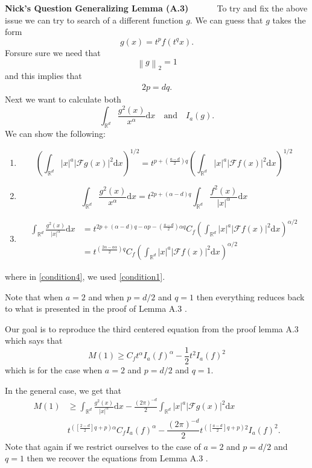 \documentclass[a4paper,11pt]{article}
\numberwithin{equation}{section}
\theoremstyle{plain}
\theoremstyle{definition}
\newcommand{\ud}{\ensuremath{\mathrm{d} }}
\newcommand{\Norm}[1]{\left\|  #1   \right\|}
\newcommand{\R}{\mathbb{R}}
\newcounter{NQ}
\newenvironment{NickQuestion}[1][] %
{\refstepcounter{NQ}
	\begin{mdframed}[backgroundcolor=lightgray]\textbf{Nick's Question \theNQ \: #1~~}~~~\noindent}%
	{\end{mdframed}}
\numberwithin{NQ}{section}
\numberwithin{LQ}{section}
\numberwithin{ZQ}{section}
\begin{document}
\begin{NickQuestion}[Generalizing Lemma (A.3) \cite{ChenAOP12}]
To try and fix the above issue we can try to search of a different function $g$. We can guess that $g$ takes the form
	\[
		g(x) = t^pf(t^qx).
	\]
Forsure sure we need that
	\[
		\Norm{g}_2 = 1
	\]
and this implies that
	\begin{align}
	2p  =dq. \label{condition1}
	\end{align}
Next we want to calculate both
	\[
		\int_{\R^d} \frac{g^2(x)}{x^\alpha} \ud x \quad \text{and} \quad I_a(g).
	\]
We can show the following:
	\begin{enumerate}
		\item
			\[
				\left(\int_{\R^d} |x|^a |\mathcal{F}g(x)|^2 \ud x\right)^{1/2} = t^{p+\left(\frac{a-d}{2}\right)q}\left( \int_{\R^d} |x|^a |\mathcal{F}f(x)|^2 \ud x \right)^{1/2}
			\]
		\item
			\[
				\int_{\R^d} \frac{g^2(x)}{x^\alpha} \ud x = t^{2p + (\alpha-d)q} \int_{\R^d} \frac{f^2(x)}{|x|^\alpha} \ud x
			\]
		\item
			\begin{align}
				\int_{\R^d} \frac{g^2(x)}{|x|^\alpha} \ud x &= t^{2p + (\alpha -d)q - \alpha p - \left(\frac{a-d}{2}\right)\alpha q} C_f \left( \int_{\R^d} |x|^a |\mathcal{F}f(x)|^2 \ud x \right)^{\alpha/2} \nonumber
				\\&= t^{\left(\frac{2\alpha - a\alpha}{2}\right)q} C_f \left( \int_{\R^d} |x|^a |\mathcal{F}f(x)|^2 \ud x \right)^{\alpha/2} \label{condition4}
			\end{align}
	\end{enumerate}
where in \eqref{condition4}, we used \eqref{condition1}.

Note that when $a=2$ and when $p=d/2$ and $q=1$ then everything reduces back to what is presented in the proof of Lemma A.3 \cite{ChenAOP12}.

Our goal is to reproduce the third centered equation from the proof lemma A.3 \cite{ChenAOP12} which says that
	\begin{equation}\label{step1}
		M(1) \ge C_f t^\alpha I_a(f)^\alpha - \frac{1}{2} t^2 I_a(f)^2
	\end{equation}
which is for the case when $a=2$ and $p=d/2$ and $q=1$.

In the general case, we get that
	\begin{align}
	M(1) &\ge \int_{\R^d} \frac{g^2(x)}{|x|^\alpha} \ud x - \frac{(2\pi)^{-d}}{2} \int_{\R^d} |x|^a |\mathcal{F}g(x)|^2 \ud x
	\\& t^{\left(\left[\frac{2-d}{2}\right]q + p\right) \alpha} C_f I_a(f)^\alpha - \dfrac{(2\pi)^{-d}}{2} t^{ \left( \left[ \frac{a-d}{2}\right]q + p \right)2 } I_a(f)^2. \label{step2}
	\end{align}
Note that again if we restrict ourselves to the case of $a=2$ and $p=d/2$ and $q=1$ then we recover the equations from Lemma A.3 \cite{ChenAOP12}.


\end{NickQuestion}
\end{document}
